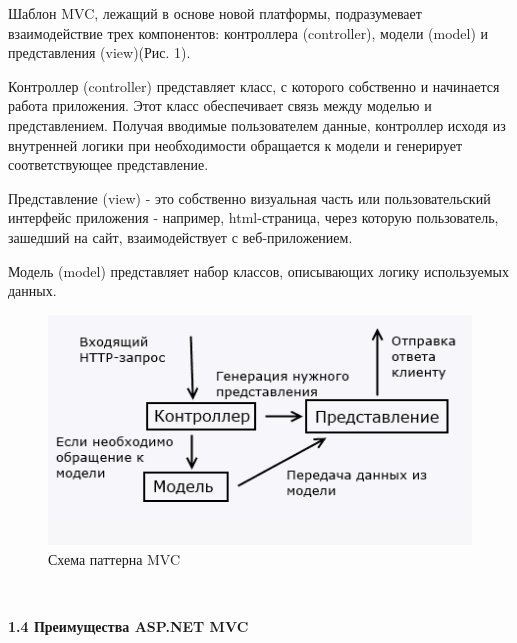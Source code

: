 \documentclass[14pt,a4paper]{extreport}
\begin{document}
	\parindent=1cm Шаблон MVC, лежащий в основе новой платформы, подразумевает взаимодействие трех компонентов: контроллера (controller), модели (model) и представления (view)(Рис. 1).\par
	Контроллер (controller) представляет класс, с которого собственно и начинается работа приложения. Этот класс обеспечивает связь между моделью и представлением. Получая вводимые пользователем данные, контроллер исходя из внутренней логики при необходимости обращается к модели и генерирует соответствующее представление.\par
	Представление (view) - это собственно визуальная часть или пользовательский интерфейс приложения - например, html-страница, через которую пользователь, зашедший на сайт, взаимодействует с веб-приложением.\par
	Модель (model) представляет набор классов, описывающих логику используемых данных.\par
	\begin{figure}[h]
	\begin{center}
	\includegraphics[scale=0.9]{mvc}
	\caption{ Схема паттерна MVC}
	\end{center}
	\end{figure}
	~\\

	\textbf{1.4 Преимущества ASP.NET MVC}
	
\end{document}
